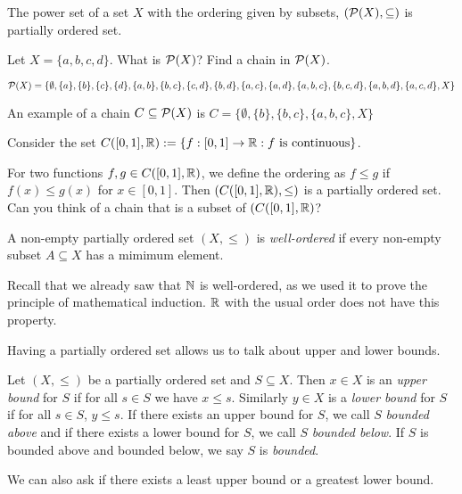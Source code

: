 \documentclass{article}
\begin{document}
\begin{example}
The power set of a set $X$ with the ordering given by subsets, $(\mathcal{P}(X), \subseteq)$ is partially ordered set. 
\end{example}

\begin{example}
Let $X = \{a,b,c,d\}$. What is $\mathcal{P}(X)$? Find a chain in $\mathcal{P}(X)$.

$\mathcal{P}(X) = \{\emptyset,\{a\},\{b\},\{c\},\{d\},\{a,b\},\{b,c\},\{c,d\},\{b,d\},\{a,c\},\{a,d\}, \{a,b,c\},\{b,c,d\},\{a,b,d\},\{a,c,d\},X\}$

An example of a chain $C \subseteq \mathcal{P}(X)$ is $C = \{\emptyset,\{b\},\{b,c\}, \{a,b,c\},X\}$
\end{example}

\begin{example}
Consider the set $C([0,1],{\mathbb{R}}):= \{f:[0,1] \to {\mathbb{R}} : f \text{ is continuous}\}$.

For two functions $f,g \in C([0,1],{\mathbb{R}})$, we define the ordering as $f \leq g$ if $f(x) \leq g(x)$ for $x \in [0,1]$. Then $(C([0,1],{\mathbb{R}}),\leq)$ is a partially ordered set. Can you think of a chain that is a subset of $(C([0,1],{\mathbb{R}})$?
\end{example}

\begin{definition}
A non-empty partially ordered set $(X,\leq)$ is \emph{well-ordered} if every non-empty subset $A \subseteq X$ has a mimimum element.
\end{definition}

Recall that we already saw that ${\mathbb{N}}$ is well-ordered, as we used it to prove the principle of mathematical induction. ${\mathbb{R}}$ with the usual order does not have this property.

Having a partially ordered set allows us to talk about upper and lower bounds. 

\begin{definition}%
Let $(X,\leq)$ be a partially ordered set and $S\subseteq X$. Then $x\in X$ is an \emph{upper bound} for $S$ if for all $s \in S$ we have $x\leq s$. Similarly $y\in X$ is a \emph{lower bound} for $S$ if for all $s\in S$, $y\leq s$. If there exists an upper bound for $S$, we call $S$ \emph{bounded above} and if there exists a lower bound for $S$, we call $S$ \emph{bounded below}. If $S$ is bounded above and bounded below, we say $S$ is \emph{bounded}. 
\end{definition}

We can also ask if there exists a least upper bound or a greatest lower bound. 
\end{document}
